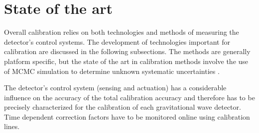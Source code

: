
\section{State of the art}
Overall calibration relies on both technologies and methods of measuring the detector’s control systems. The development of technologies important for calibration are discussed in the following subsections. The methods are generally platform specific, but the state of the art in calibration methods involve the use of MCMC simulation to determine unknown systematic uncertainties \cite{CalUncert2017}.

The detector's control system (sensing and actuation) has a considerable influence on the accuracy of the total calibration accuracy and therefore has to be precisely characterized for the calibration of each gravitational wave detector. Time dependent correction factors have to be monitored online using  calibration lines.

